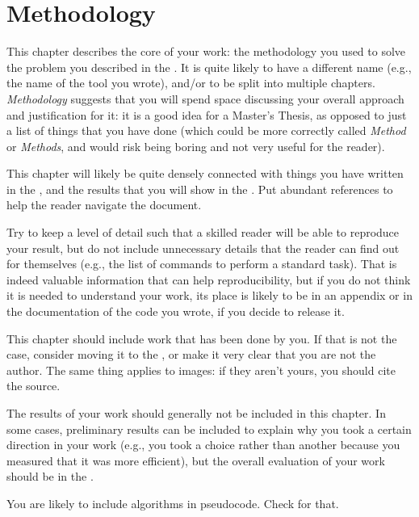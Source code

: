 \chapter{Methodology}\label{ch:method}

This chapter describes the core of your work: the methodology you used to solve the problem you described in the .
It is quite likely to have a different name (e.g., the name of the tool you wrote), and/or to be split into multiple chapters.
\emph{Methodology} suggests that you will spend space discussing your overall approach and justification for it:
it is a good idea for a Master's Thesis, as opposed to just a list of things that you have done (which could be more correctly called \emph{Method} or \emph{Methods}, and would risk being boring and not very useful for the reader).

This chapter will likely be quite
densely connected with things you have written in the ,
and the results that you will show in the . Put abundant
references to help the reader navigate the document.

Try to keep a level of detail such that a skilled reader will be able to reproduce your result,
but do not include unnecessary details that the reader can find out for themselves (e.g., the
list of commands to perform a standard task). That is indeed valuable information that can help
reproducibility, but if you do not think it is needed to understand your work, its place is
likely to be in an appendix or in the documentation of the code you wrote, if you decide to
release it.

This chapter should include work that has been done by you. If that is not the case, consider
moving it to the , or make it very clear that you are
not the author. The same thing applies to images: if they aren't yours, you should cite the
source.

The results of your work should generally not be included in this chapter. In some cases,
preliminary results can be included to explain why you took a certain direction in your work
(e.g., you took a choice rather than another because you measured that it was more efficient),
but the overall evaluation of your work should be in the .

You are likely to include algorithms in pseudocode. Check
 for that.
